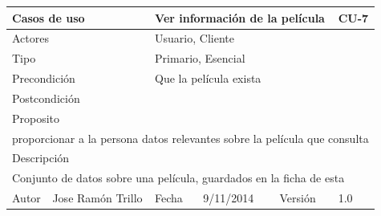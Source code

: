 \documentclass{article}
\begin{document}
\begin{table}[h]
\begin{tabular}{|l|l|l|l|l|l|}
\hline
\multicolumn{2}{|p{2cm}|}{Casos de uso}  & \multicolumn{3}{p{7cm}|}{\textbf{Ver información de la película}} & CU-7 \\
\hline
\multicolumn{2}{|p{2cm}|}{Actores}       & \multicolumn{4}{p{8cm}|}{Usuario, Cliente}        \\
\hline
\multicolumn{2}{|p{2cm}|}{Tipo}          & \multicolumn{4}{p{8cm}|}{Primario, Esencial}        \\
\hline
\multicolumn{2}{|p{2cm}|}{Precondición}  & \multicolumn{4}{p{8cm}|}{Que la película exista}        \\
\hline
\multicolumn{2}{|p{2cm}|}{Postcondición} & \multicolumn{4}{p{8cm}|}{}        \\
\hline
\multicolumn{6}{|p{10cm}|}{Proposito}                                   \\
\hline
\multicolumn{6}{|p{10cm}|}{proporcionar a la persona datos relevantes sobre la película que consulta}                                            \\
\hline
\multicolumn{6}{|p{10cm}|}{Descripción}                                 \\
\hline
\multicolumn{6}{|p{10cm}|}{Conjunto de datos sobre una película, guardados en la ficha de esta }                                            \\
\hline
Autor              &     Jose Ramón Trillo         & Fecha    & 9/11/2014    &   Versión  &1.0\\
\hline
\end{tabular}
\end{table}
\end{document}
